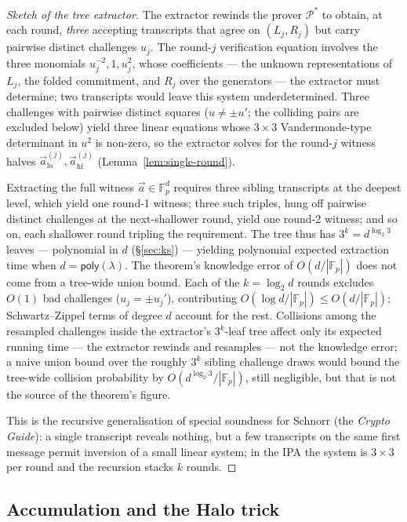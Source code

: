 \documentclass[11pt,a4paper]{article}
\theoremstyle{definition}
\newcommand{\F}{\mathbb{F}}
\newcommand{\poly}{\mathsf{poly}}
\begin{document}
\begin{proof}[Sketch of the tree extractor]
The extractor rewinds the prover $\mathcal{P}^*$ to obtain, at each
round, \emph{three} accepting transcripts that agree on $(L_j, R_j)$ but
carry pairwise distinct challenges $u_j$. The round-$j$ verification
equation involves the three monomials $u_j^{-2}, 1, u_j^2$, whose
coefficients --- the unknown representations of $L_j$, the folded
commitment, and $R_j$ over the generators --- the extractor must
determine; two transcripts would leave this system underdetermined.
Three challenges with pairwise distinct squares (\(u \ne \pm u'\); the
colliding pairs are excluded below) yield three linear equations whose
\(3 \times 3\) Vandermonde-type determinant in \(u^2\) is non-zero, so
the extractor solves for the
round-$j$ witness halves $\vec{a}_{\mathrm{lo}}^{(j)},
\vec{a}_{\mathrm{hi}}^{(j)}$ (Lemma~\ref{lem:single-round}).

Extracting the full witness $\vec{a} \in \F_p^d$ requires three sibling
transcripts at the deepest level, which yield one round-1 witness; three
such triples, hung off pairwise distinct challenges at the next-shallower
round, yield one round-2 witness; and so on, each shallower round
tripling the requirement. The tree thus has
$3^k = d^{\log_2 3}$ leaves --- polynomial in $d$ (\S\ref{sec:ks}) ---
yielding polynomial expected extraction time when $d = \poly(\lambda)$.
The theorem's knowledge error of $O(d / |\F_p|)$ does not come from a
tree-wide union bound. Each of the $k = \log_2 d$ rounds excludes $O(1)$
bad challenges ($u_j = \pm u_j'$), contributing
$O(\log d / |\F_p|) \le O(d / |\F_p|)$; Schwartz--Zippel terms of degree
$d$ account for the rest. Collisions among the resampled challenges
inside the extractor's $3^k$-leaf tree affect only its expected running
time --- the extractor rewinds and resamples --- not the knowledge error;
a naive union bound over the roughly $3^k$ sibling challenge draws would
bound the tree-wide collision probability by
$O(d^{\log_2 3} / |\F_p|)$, still negligible, but that is not the source
of the theorem's figure.

This is the recursive generalisation of special soundness for Schnorr
(the \emph{Crypto Guide}): a single transcript reveals nothing, but a few
transcripts on the same first message permit inversion of a small linear
system; in the IPA the system is $3 \times 3$ per round and the recursion
stacks $k$ rounds.
\end{proof}
\subsection{Accumulation and the Halo trick}\label{sec:halo-acc}
\end{document}
